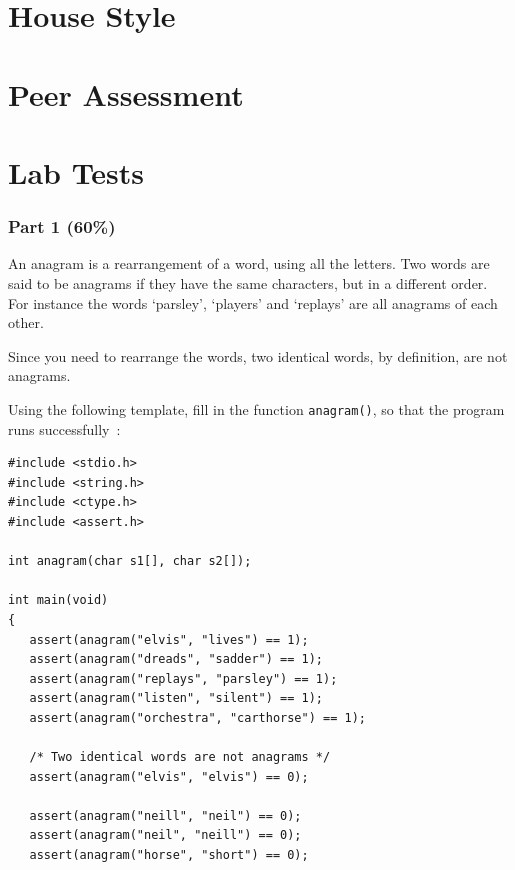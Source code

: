 \appendix
\begin{appendices}

\chapter{House Style}
\label{appendix:style}


\chapter{Peer Assessment}



\chapter{Lab Tests}





\newpage
{}
\subsection*{Part 1 (60\%)}

An anagram is a rearrangement of a word, using all the letters.
Two words are said to be anagrams if they have the same characters,
but in a different order.
For instance the words `parsley', `players' and `replays'
are all anagrams of each other.

Since you need to rearrange the words, two identical words, by definition, are not anagrams.

Using the following template, fill in the function \verb^anagram()^,
so that the program runs successfully~:
\begin{verbatim}
#include <stdio.h>
#include <string.h>
#include <ctype.h>
#include <assert.h>

int anagram(char s1[], char s2[]);

int main(void)
{
   assert(anagram("elvis", "lives") == 1);
   assert(anagram("dreads", "sadder") == 1);
   assert(anagram("replays", "parsley") == 1);
   assert(anagram("listen", "silent") == 1);
   assert(anagram("orchestra", "carthorse") == 1);

   /* Two identical words are not anagrams */
   assert(anagram("elvis", "elvis") == 0);

   assert(anagram("neill", "neil") == 0);
   assert(anagram("neil", "neill") == 0);
   assert(anagram("horse", "short") == 0);


\end{verbatim}
\end{appendices}
